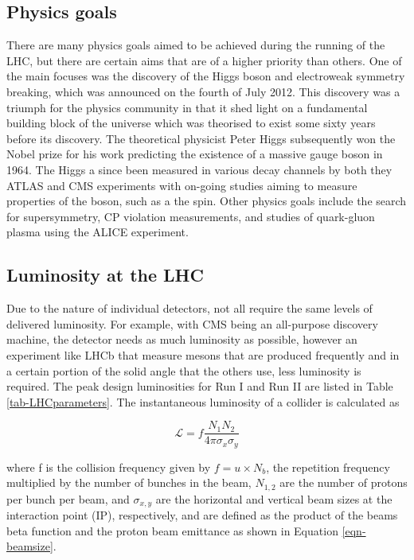 \subsection{Physics goals}

 There are many physics goals aimed to be achieved during the running of the LHC, but there are certain aims that are of a higher priority than others. One of the main focuses was the discovery of the Higgs boson and electroweak symmetry breaking, which was announced on the fourth of July 2012. This discovery was a triumph for the physics community in that it shed light on a fundamental building block of the universe which was theorised to exist some sixty years before its discovery. The theoretical physicist Peter Higgs subsequently won the Nobel prize for his work predicting the existence of a massive gauge boson in 1964. The Higgs a since been measured in various decay channels by both they ATLAS and CMS experiments with on-going studies aiming to measure properties of the boson, such as a the spin. Other physics goals include the search for supersymmetry, CP violation measurements, and studies of quark-gluon plasma using the ALICE experiment.  

\subsection{Luminosity at the LHC}

Due to the nature of individual detectors, not all require the same levels of delivered luminosity. For example, with CMS being an all-purpose discovery machine, the detector needs as much luminosity as possible, however an experiment like LHCb that measure mesons that are produced frequently and in a certain portion of the solid angle that the others use, less luminosity is required. The peak design luminosities for Run I and Run II are listed in Table \ref{tab-LHCparameters}. The instantaneous luminosity of a collider is calculated as

\begin{equation}
\mathcal{L}=f\frac{N_1N_2}{4\pi\sigma_x\sigma_y}
\end{equation}

where f is the collision frequency given by $f=u\times N_b$, the repetition frequency multiplied by the number of bunches in the beam, $N_{1,2}$ are the number of protons per bunch per beam, and $\sigma_{x,y}$ are the horizontal and vertical beam sizes at the interaction point (IP), respectively, and are defined as the product of the beams beta function and the proton beam emittance as shown in Equation \ref{eqn-beamsize}.

